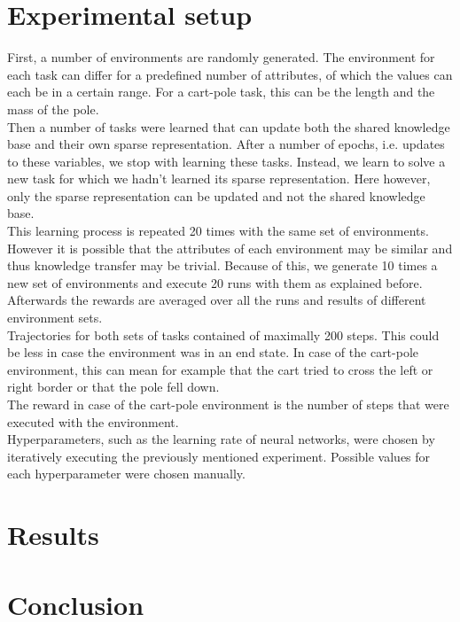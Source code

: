 \documentclass[a4paper]{article}
\begin{document}
\section{Experimental setup}
First, a number of environments are randomly generated. The environment for each task can differ for a predefined number of attributes, of which the values can each be in a certain range. For a cart-pole task, this can be the length and the mass of the pole.\\
Then a number of tasks were learned that can update both the shared knowledge base and their own sparse representation. After a number of epochs, i.e. updates to these variables, we stop with learning these tasks. Instead, we learn to solve a new task for which we hadn't learned its sparse representation. Here however, only the sparse representation can be updated and not the shared knowledge base.\\
This learning process is repeated 20 times with the same set of environments. However it is possible that the attributes of each environment may be similar and thus knowledge transfer may be trivial. Because of this, we generate 10 times a new set of environments and execute 20 runs with them as explained before.\\
Afterwards the rewards are averaged over all the runs and results of different environment sets.\\
Trajectories for both sets of tasks contained of maximally 200 steps. This could be less in case the environment was in an end state. In case of the cart-pole environment, this can mean for example that the cart tried to cross the left or right border or that the pole fell down.\\
The reward in case of the cart-pole environment is the number of steps that were executed with the environment.\\
Hyperparameters, such as the learning rate of neural networks, were chosen by iteratively executing the previously mentioned experiment. Possible values for each hyperparameter were chosen manually.
\section{Results}
\section{Conclusion}



\end{document}
